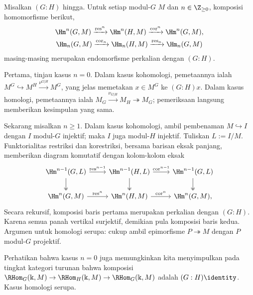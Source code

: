 \begin{proposisi}\label{prop:res-cor}
	Misalkan $(G:H)$ hingga. Untuk setiap modul-$G$ $M$ dan
	$n\in\Z_{\geq0}$, komposisi homomorfisme berikut,
	\begin{gather*}
		\Hm^n(G, M) \xrightarrow{\mathrm{res}^n} \Hm^n(H, M) \xrightarrow{\mathrm{cor}^n} \Hm^n(G, M), \\
		\Hm_n(G, M) \xrightarrow{\mathrm{cor}_n} \Hm_n(H, M) \xrightarrow{\mathrm{res}_n} \Hm_n(G, M)
	\end{gather*}
	masing-masing merupakan endomorfisme perkalian dengan $(G:H)$.
\end{proposisi}
\begin{bukti}
	Pertama, tinjau kasus $n=0$. Dalam kasus kohomologi, pemetaannya ialah
	$M^G\hookrightarrow M^H\xrightarrow{\nu^{G|H}}M^G$, yang jelas memetakan
	$x\in M^G$ ke $(G:H)x$. Dalam kasus homologi, pemetaannya ialah
	$M_G\xrightarrow{\nu_{G|H}}M_H\twoheadrightarrow M_G$; pemeriksaan langsung
	memberikan kesimpulan yang sama.
	
	Sekarang misalkan $n\geq1$. Dalam kasus kohomologi, ambil pembenaman
	$M\hookrightarrow I$ dengan $I$ modul-$G$ injektif; maka $I$ juga modul-$H$
	injektif. Tuliskan $L:=I/M$. Funktorialitas restriksi dan korestriksi,
	bersama barisan eksak panjang, memberikan diagram komutatif dengan
	kolom-kolom eksak
	\[\begin{tikzcd}
		\Hm^{n-1}(G, L) \arrow[r, "{\mathrm{res}^{n-1}}"] \arrow[twoheadrightarrow, d] & \Hm^{n-1}(H, L) \arrow[r, "{\mathrm{cor}^{n-1}}"] \arrow[twoheadrightarrow, d] & \Hm^{n-1}(G, L) \arrow[twoheadrightarrow, d] \\
		\Hm^n(G, M) \arrow[r, "{\mathrm{res}^n}"] & \Hm^n(H, M) \arrow[r, "{\mathrm{cor}^n}"] & \Hm^n(G, M),
	\end{tikzcd}\]
	Secara rekursif, komposisi baris pertama merupakan perkalian dengan $(G:H)$.
	Karena semua panah vertikal surjektif, demikian pula komposisi baris kedua.
	Argumen untuk homologi serupa: cukup ambil epimorfisme $P\twoheadrightarrow M$
	dengan $P$ modul-$G$ projektif.
	
	Perhatikan bahwa kasus $n=0$ juga memungkinkan kita menyimpulkan pada
	tingkat kategori turunan bahwa komposisi
	$\RHom_G(\Bbbk,M)\to\RHom_H(\Bbbk,M)\to\RHom_G(\Bbbk,M)$ adalah
	$(G:H)\identity$. Kasus homologi serupa.
\end{bukti}

